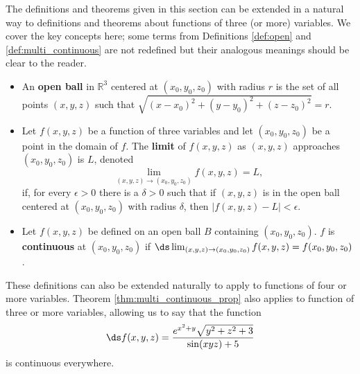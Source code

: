 The definitions and theorems given in this section can be extended in a natural way to definitions and theorems about functions of three (or more) variables. We cover the key concepts here; some terms from Definitions \ref{def:open} and \ref{def:multi_continuous} are not redefined but their analogous meanings should be clear to the reader.

\setboxwidth{20pt}
{ 
\begin{itemize}
\item An \textbf{open ball} in $\mathbb{R}^3$ centered at $(x_0,y_0,z_0)$ with radius $r$ is the set of all points $(x,y,z)$ such that $\sqrt{(x-x_0)^2+(y-y_0)^2+(z-z_0)^2} = r$.\\

\item Let $f(x,y,z)$ be a function of three variables and let $(x_0,y_0,z_0)$ be a point in the domain of $f$. The \textbf{limit} of $f(x,y,z)$ as $(x,y,z)$ approaches $(x_0,y_0,z_0)$ is $L$, denoted 
$$\lim_{(x,y,z)\to (x_0,y_0,z_0)} f(x,y,z) = L,$$
if, for every $\epsilon >0$ there is a $\delta >0$ such that if $(x,y,z)$ is in the open ball centered at $(x_0,y_0,z_0)$ with radius $\delta$, then $|f(x,y,z) - L|< \epsilon$.\\

\item Let $f(x,y,z)$ be defined on an open ball $B$ containing $(x_0,y_0,z_0)$. $f$ is \textbf{continuous} at $(x_0,y_0,z_0)$ if $\ds \lim_{(x,y,z)\to (x_0,y_0,z_0)} f(x,y,z) = f(x_0,y_0,z_0)$.
\end{itemize}
}
\restoreboxwidth

These definitions can also be extended naturally to apply to functions of four or more variables. Theorem \ref{thm:multi_continuous_prop} also applies to function of three or more variables, allowing us to say that the function $$\ds f(x,y,z) = \frac{e^{x^2+y}\sqrt{y^2+z^2+3}}{\sin (xyz)+5}$$ is continuous everywhere.


